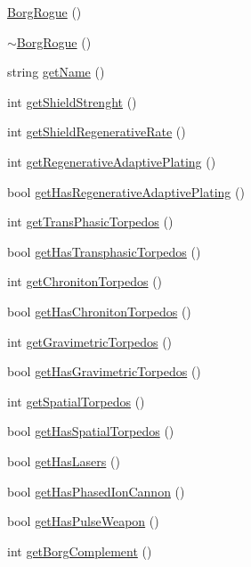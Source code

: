 \begin{DoxyCompactItemize}
\item 
\hyperlink{classBorgRogue_ac7a4f4b617206d1b2ef3489a533f69e9}{BorgRogue} ()
\item 
\hyperlink{classBorgRogue_a1afdc1a65a85e59f0e598a4877f173b7}{$\sim$BorgRogue} ()
\item 
string \hyperlink{classBorgRogue_ac4b4cf44886438d6e4cd6933ac46ae0e}{getName} ()
\item 
int \hyperlink{classBorgRogue_a8d64c0f319f734e69aa9592cbaf29892}{getShieldStrenght} ()
\item 
int \hyperlink{classBorgRogue_a055c08424838cd6defd5d264b9d55532}{getShieldRegenerativeRate} ()
\item 
int \hyperlink{classBorgRogue_ac5d9f8c62b43fefdc61fe672a8510fa0}{getRegenerativeAdaptivePlating} ()
\item 
bool \hyperlink{classBorgRogue_aff3dbb33470200cc97860ca2d4b22ca5}{getHasRegenerativeAdaptivePlating} ()
\item 
int \hyperlink{classBorgRogue_ab8d59b4fb9983b55896a0790e701ff7a}{getTransPhasicTorpedos} ()
\item 
bool \hyperlink{classBorgRogue_a2b62489036e3bd2e1ce51fbb06f90ec2}{getHasTransphasicTorpedos} ()
\item 
int \hyperlink{classBorgRogue_a6403ee1ec00f94a9607a35b77b539e78}{getChronitonTorpedos} ()
\item 
bool \hyperlink{classBorgRogue_a8e4728091fa86cc8cf1122975f4fd9e4}{getHasChronitonTorpedos} ()
\item 
int \hyperlink{classBorgRogue_af1d6b12ee69cdc85a2417c1b25d36f19}{getGravimetricTorpedos} ()
\item 
bool \hyperlink{classBorgRogue_a1f4fd1ce4d664b532c7095513f530241}{getHasGravimetricTorpedos} ()
\item 
int \hyperlink{classBorgRogue_ad79dc4b3ce9c83724fc250cb918bcb8f}{getSpatialTorpedos} ()
\item 
bool \hyperlink{classBorgRogue_ae3dc5dcd0f872f8960799795882231de}{getHasSpatialTorpedos} ()
\item 
bool \hyperlink{classBorgRogue_a9a32c764b84654af68bfcc3fc934460c}{getHasLasers} ()
\item 
bool \hyperlink{classBorgRogue_af2c0c7885c76c080c2e255069672c13b}{getHasPhasedIonCannon} ()
\item 
bool \hyperlink{classBorgRogue_acfd7c55d67ff89410eed4270c88f0e2f}{getHasPulseWeapon} ()
\item 
int \hyperlink{classBorgRogue_ab48a76b7a43d96a9b7f63f5b7cdc01d7}{getBorgComplement} ()

\end{DoxyCompactItemize}
